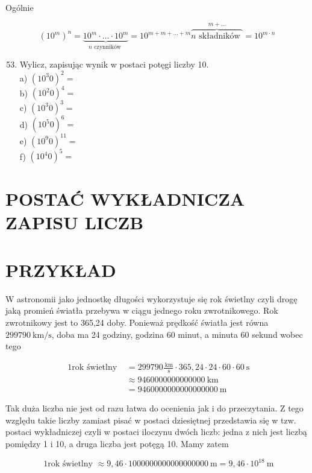 \documentclass[10pt]{article}
\begin{document}
Ogólnie

\[
\left(10^{m}\right)^{n}=\underbrace{10^{m} \cdot \ldots \cdot 10^{m}}_{n \text { czynników }}=10^{m+m+\ldots+m} \overbrace{n \text { składników }}^{m+\ldots}=10^{m \cdot n}
\]

\begin{enumerate}
  \setcounter{enumi}{52}
  \item Wylicz, zapisując wynik w postaci potęgi liczby 10.\\
a) \(\left(10^{3} 0\right)^{2}=\)\\
b) \(\left(10^{2} 0\right)^{4}=\)\\
c) \(\left(10^{3} 0\right)^{3}=\)\\
d) \(\left(10^{5} 0\right)^{6}=\)\\
e) \(\left(10^{9} 0\right)^{11}=\)\\
f) \(\left(10^{4} 0\right)^{5}=\)
\end{enumerate}

\section*{POSTAĆ WYKŁADNICZA ZAPISU LICZB}
\section*{PRZYKŁAD}
W astronomii jako jednostkę długości wykorzystuje się rok świetlny czyli drogę jaką promień światła przebywa w ciągu jednego roku zwrotnikowego. Rok zwrotnikowy jest to 365,24 doby. Ponieważ prędkość światła jest równa \(299790 \mathrm{~km} / \mathrm{s}\), doba ma 24 godziny, godzina 60 minut, a minuta 60 sekund wobec tego

\[
\begin{aligned}
\text { 1rok świetlny } & =299790 \frac{\mathrm{~km}}{\mathrm{~s}} \cdot 365,24 \cdot 24 \cdot 60 \cdot 60 \mathrm{~s} \\
& \approx 9460000000000000 \mathrm{~km} \\
& =9460000000000000000 \mathrm{~m}
\end{aligned}
\]

Tak duża liczba nie jest od razu łatwa do ocenienia jak i do przeczytania. Z tego względu takie liczby zamiast pisać w postaci dziesiętnej przedstawia się w tzw. postaci wykładniczej czyli w postaci iloczynu dwóch liczb: jedna z nich jest liczbą pomiędzy 1 i 10, a druga liczba jest potęgą 10. Mamy zatem

\[
\text { 1rok świetlny } \approx 9,46 \cdot 1000000000000000000 \mathrm{~m}=9,46 \cdot 10^{18} \mathrm{~m}
\]
\end{document}
